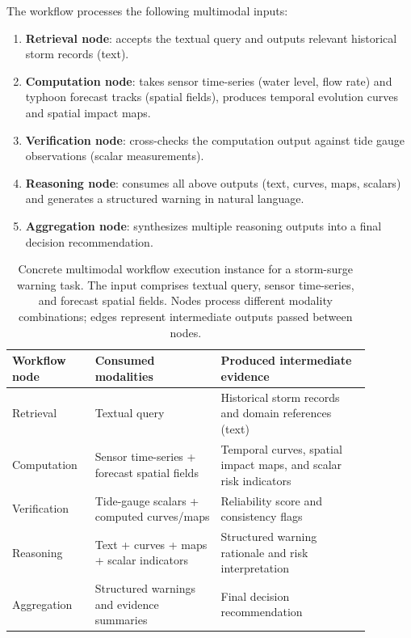 \documentclass[manuscript,review,anonymous]{acmart}
\begin{document}
The workflow processes the following multimodal inputs:

\begin{enumerate}
    \item \textbf{Retrieval node}: accepts the textual query and outputs relevant historical storm records (text).
    \item \textbf{Computation node}: takes sensor time-series (water level, flow rate) and typhoon forecast tracks (spatial fields), produces temporal evolution curves and spatial impact maps.
    \item \textbf{Verification node}: cross-checks the computation output against tide gauge observations (scalar measurements).
    \item \textbf{Reasoning node}: consumes all above outputs (text, curves, maps, scalars) and generates a structured warning in natural language.
    \item \textbf{Aggregation node}: synthesizes multiple reasoning outputs into a final decision recommendation.
\end{enumerate}

\begin{table}[t]
\centering
\caption{Concrete multimodal workflow execution instance for a storm-surge warning task. The input comprises textual query, sensor time-series, and forecast spatial fields. Nodes process different modality combinations; edges represent intermediate outputs passed between nodes.}
\label{tab:multimodal_workflow_example}
\small
\begin{tabular}{p{0.18\linewidth}p{0.32\linewidth}p{0.38\linewidth}}
\toprule
\textbf{Workflow node} & \textbf{Consumed modalities} & \textbf{Produced intermediate evidence} \\
\midrule
Retrieval & Textual query & Historical storm records and domain references (text) \\
Computation & Sensor time-series + forecast spatial fields & Temporal curves, spatial impact maps, and scalar risk indicators \\
Verification & Tide-gauge scalars + computed curves/maps & Reliability score and consistency flags \\
Reasoning & Text + curves + maps + scalar indicators & Structured warning rationale and risk interpretation \\
Aggregation & Structured warnings and evidence summaries & Final decision recommendation \\
\bottomrule
\end{tabular}
\end{table}
\end{document}
